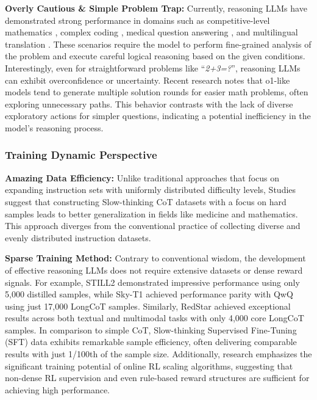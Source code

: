 \noindent\textbf{Overly Cautious \& Simple Problem Trap:} Currently, reasoning LLMs have demonstrated strong performance in domains such as competitive-level mathematics \cite{Deepseek-R1, qwq-32b-preview, RedStar, sky_t1_2025}, complex coding \cite{o1_coder}, medical question answering \cite{Huatuo-o1, huang2025o1}, and multilingual translation \cite{Marco_o1, DRT-o1}. 
These scenarios require the model to perform fine-grained analysis of the problem and execute careful logical reasoning based on the given conditions. 
Interestingly, even for straightforward problems like ``\textit{2+3=?}'', reasoning LLMs can exhibit overconfidence or uncertainty. 
Recent research \cite{Tecent_2_plus_3} notes that o1-like models tend to generate multiple solution rounds for easier math problems, often exploring unnecessary paths. 
This behavior contrasts with the lack of diverse exploratory actions for simpler questions, indicating a potential inefficiency in the model's reasoning process.


\subsubsection{Training Dynamic Perspective}\label{dynamic_perspective}

\textbf{Amazing Data Efficiency:} Unlike traditional approaches that focus on expanding instruction sets with uniformly distributed difficulty levels, Studies \cite{huang2025o1, RedStar} suggest that constructing Slow-thinking CoT datasets with a focus on hard samples leads to better generalization in fields like medicine and mathematics. 
This approach diverges from the conventional practice of collecting diverse and evenly distributed instruction datasets.



\noindent\textbf{Sparse Training Method:} 
Contrary to conventional wisdom, the development of effective reasoning LLMs does not require extensive datasets or dense reward signals. 
For example, STILL2 \cite{o1_Journey_Part2} demonstrated impressive performance using only 5,000 distilled samples, while Sky-T1 \cite{sky_t1_2025} achieved performance parity with QwQ \cite{qwq-32b-preview} using just 17,000 LongCoT samples. 
Similarly, RedStar \cite{RedStar} achieved exceptional results across both textual and multimodal tasks with only 4,000 core LongCoT samples. 
In comparison to simple CoT, Slow-thinking Supervised Fine-Tuning (SFT) data exhibits remarkable sample efficiency, often delivering comparable results with just 1/100th of the sample size. 
Additionally, research \cite{simplerl_reason_blob} emphasizes the significant training potential of online RL scaling algorithms, suggesting that non-dense RL supervision and even rule-based reward structures are sufficient for achieving high performance.

